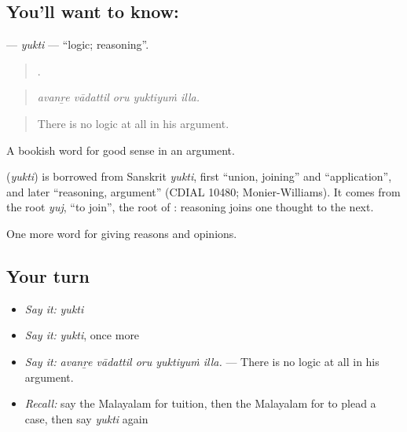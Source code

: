 \subsection*{You'll want to know: }
\textbf{} — \emph{yukti} — \textquotedblleft{}logic; reasoning\textquotedblright{}.

\begin{quote}
    .
\end{quote}

\begin{quote}
\emph{avanṟe vādattil oru yuktiyuṁ illa.}
\end{quote}

\begin{quote}
There is no logic at all in his argument.
\end{quote}

A bookish word for good sense in an argument.

\begin{cousinweb}
\textbf{} (\emph{yukti}) is borrowed from Sanskrit \emph{yukti}, first \textquotedblleft{}union, joining\textquotedblright{} and \textquotedblleft{}application\textquotedblright{}, and later \textquotedblleft{}reasoning, argument\textquotedblright{} (CDIAL 10480; Monier-Williams). It comes from the root \emph{yuj}, \textquotedblleft{}to join\textquotedblright{}, the root of : reasoning joins one thought to the next.
\end{cousinweb}

\begin{grammarlens}[title={What you've built}]
One more word for giving reasons and opinions.
\end{grammarlens}

\subsection*{Your turn}
\begin{itemize}
\raggedright
  \item \emph{Say it:} \emph{yukti}
  \item \emph{Say it:} \emph{yukti}, once more
  \item \emph{Say it:} \emph{avanṟe vādattil oru yuktiyuṁ illa.} — There is no logic at all in his argument.
  \item \emph{Recall:} say the Malayalam for tuition, then the Malayalam for to plead a case, then say \emph{yukti} again
\end{itemize}

